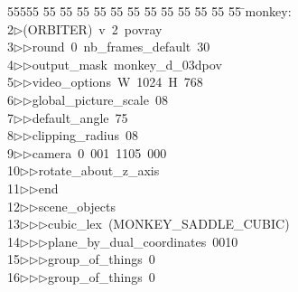 %
%
\begin{tabbing}
55555 \= 55 \= 55 \= 55 \= 55 \= 55 \= 55 \= 55 \= 55 \= 55 \= 55 \= 55 \= 55 \= \>monkey:\\[0pt]
2\>$\triangleright$\>(ORBITER)\ v\ 2\ povray\ \\[0pt]
3\>$\triangleright$\>$\triangleright$\>round\ 0\ nb\_frames\_default\ 30\ \\[0pt]
4\>$\triangleright$\>$\triangleright$\>output\_mask\ monkey\_d\_03dpov\ \\[0pt]
5\>$\triangleright$\>$\triangleright$\>video\_options\ W\ 1024\ H\ 768\ \\[0pt]
6\>$\triangleright$\>$\triangleright$\>global\_picture\_scale\ 08\ \\[0pt]
7\>$\triangleright$\>$\triangleright$\>default\_angle\ 75\ \\[0pt]
8\>$\triangleright$\>$\triangleright$\>clipping\_radius\ 08\ \\[0pt]
9\>$\triangleright$\>$\triangleright$\>camera\ 0\ 001\ 1105\ 000\ \\[0pt]
10\>$\triangleright$\>$\triangleright$\>rotate\_about\_z\_axis\ \\[0pt]
11\>$\triangleright$\>$\triangleright$\>end\ \\[0pt]
12\>$\triangleright$\>$\triangleright$\>scene\_objects\ \\[0pt]
13\>$\triangleright$\>$\triangleright$\>$\triangleright$\>cubic\_lex\ (MONKEY\_SADDLE\_CUBIC)\ \\[0pt]
14\>$\triangleright$\>$\triangleright$\>$\triangleright$\>plane\_by\_dual\_coordinates\ 0010\ \\[0pt]
15\>$\triangleright$\>$\triangleright$\>$\triangleright$\>group\_of\_things\ 0\ \\[0pt]
16\>$\triangleright$\>$\triangleright$\>$\triangleright$\>group\_of\_things\ 0\ \\[0pt]

\end{tabbing}

